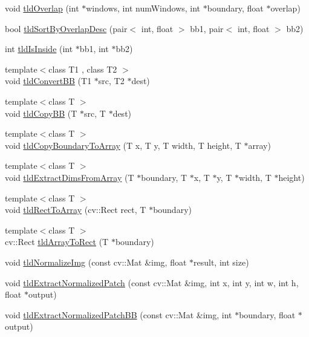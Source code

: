 \begin{DoxyCompactItemize}
\item 
void \hyperlink{namespacetld_aa9470de30170cb8b3f877dcae45df1b1}{tldOverlap} (int $\ast$windows, int numWindows, int $\ast$boundary, float $\ast$overlap)
\item 
bool \hyperlink{namespacetld_a1899d52f23a94a9042fb95249b4714ba}{tldSortByOverlapDesc} (pair$<$ int, float $>$ bb1, pair$<$ int, float $>$ bb2)
\item 
int \hyperlink{namespacetld_a8b28e6d4868ad30e826a6248dd2ae7a0}{tldIsInside} (int $\ast$bb1, int $\ast$bb2)
\item 
{\footnotesize template$<$class T1 , class T2 $>$ }\\void \hyperlink{namespacetld_add9262bbbd3c30e3b3bf213e9db13eaf}{tldConvertBB} (T1 $\ast$src, T2 $\ast$dest)
\item 
{\footnotesize template$<$class T $>$ }\\void \hyperlink{namespacetld_a30509a7fb73b21f5006046344ffab792}{tldCopyBB} (T $\ast$src, T $\ast$dest)
\item 
{\footnotesize template$<$class T $>$ }\\void \hyperlink{namespacetld_a8ea4baf48c6ac8c9fc11d0aa36c612e3}{tldCopyBoundaryToArray} (T x, T y, T width, T height, T $\ast$array)
\item 
{\footnotesize template$<$class T $>$ }\\void \hyperlink{namespacetld_aa675c63accc23d4c92133be7f5d93f1f}{tldExtractDimsFromArray} (T $\ast$boundary, T $\ast$x, T $\ast$y, T $\ast$width, T $\ast$height)
\item 
{\footnotesize template$<$class T $>$ }\\void \hyperlink{namespacetld_acca496d96df1e566f1a08bebb7e75f1c}{tldRectToArray} (cv::Rect rect, T $\ast$boundary)
\item 
{\footnotesize template$<$class T $>$ }\\cv::Rect \hyperlink{namespacetld_a8f2edbadab9bc04731c73571340969a9}{tldArrayToRect} (T $\ast$boundary)
\item 
void \hyperlink{namespacetld_a52701d320c58fc890fc8e6321aaae61c}{tldNormalizeImg} (const cv::Mat \&img, float $\ast$result, int size)
\item 
void \hyperlink{namespacetld_ac965be65b1eae7ec666c3bfbe9da065e}{tldExtractNormalizedPatch} (const cv::Mat \&img, int x, int y, int w, int h, float $\ast$output)
\item 
void \hyperlink{namespacetld_a44b5f4d4d087d3369129bdc92e2a555a}{tldExtractNormalizedPatchBB} (const cv::Mat \&img, int $\ast$boundary, float $\ast$output)

\end{DoxyCompactItemize}
